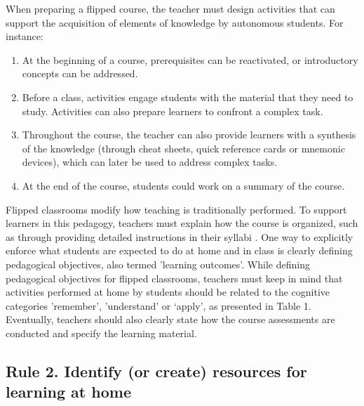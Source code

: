 \documentclass[10pt,letterpaper]{article}
\begin{document}
When preparing a flipped course, the teacher must design activities that can support 
the acquisition of elements of knowledge by autonomous students. For instance:

\begin{enumerate}

\item At the beginning of a course, prerequisites can be reactivated, or introductory concepts can be addressed.

\item Before a class, activities engage students with the material that they need to study. 
Activities can also prepare learners to confront a complex task.

\item Throughout the course, the teacher can also provide learners with a synthesis of the knowledge 
(through cheat sheets, quick reference cards or mnemonic devices), which can later be used to address complex tasks.

\item At the end of the course, students could work on a summary of the course.

\end{enumerate}

Flipped classrooms modify how teaching is traditionally performed. To support learners in this pedagogy, 
teachers must explain how the course is organized, such as through providing detailed instructions in
their syllabi \cite{grunert_obrien_course_2008}. One way to explicitly enforce what students 
are expected to do at home and in class is clearly defining pedagogical objectives, also termed 'learning outcomes'. 
While defining pedagogical objectives for flipped classrooms, teachers must keep in mind 
that activities performed at home by students should be related to the cognitive categories 'remember', 'understand' 
or `apply', as presented in Table 1. Eventually, teachers should also clearly state how the course assessments 
are conducted and specify the learning material.


\subsection{Rule 2. Identify (or create) resources for learning at home}
\end{document}
